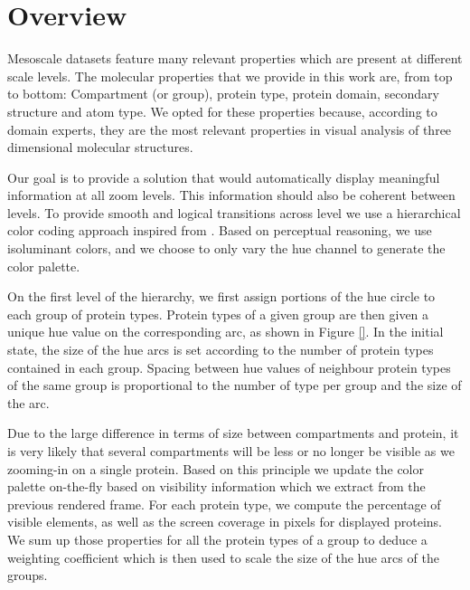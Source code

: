 \documentclass[review,journal]{vgtc}         %
\begin{document}
\section{Overview}
\label{Overview}




Mesoscale datasets feature many relevant properties which are present at different scale levels.
The molecular properties that we provide in this work are, from top to bottom: Compartment (or group), protein type, protein domain, secondary structure and atom type.
We opted for these properties because, according to domain experts, they are the most relevant properties in visual analysis of three dimensional molecular structures.


Our goal is to provide a solution that would automatically display meaningful information at all zoom levels.
This information should also be coherent between levels.
To provide smooth and logical transitions across level we use a hierarchical color coding approach inspired from \cite{tennekes2014tree}.
Based on perceptual reasoning, we use isoluminant colors, and we choose to only vary the hue channel to generate the color palette. 

On the first level of the hierarchy, we first assign portions of the hue circle to each group of protein types.
Protein types of a given group are then given a unique hue value on the corresponding arc, as shown in Figure \ref{}.
In the initial state, the size of the hue arcs is set according to the number of protein types contained in each group. 
Spacing between hue values of neighbour protein types of the same group is proportional to the number of type per group and the size of the arc. 

Due to the large difference in terms of size between compartments and protein, it is very likely that several compartments will be less or no longer be visible as we zooming-in on a single protein. 
Based on this principle we update the color palette on-the-fly based on visibility information which we extract from the previous rendered frame.
For each protein type, we compute the percentage of visible elements, as well as the screen coverage in pixels for displayed proteins.
We sum up those properties for all the protein types of a group to deduce a weighting coefficient which is then used to scale the size of the hue arcs of the groups.
\end{document}
